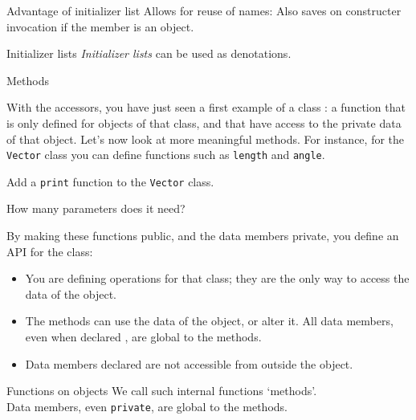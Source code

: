 \begin{block}{Advantage of initializer list}
  \label{sl:class-init-why}
  Allows for reuse of names:
  Also saves on constructer invocation if the member is an object.
\end{block}

\begin{block}{Initializer lists}
  \label{sl:class-inlist}
  \emph{Initializer lists} can be used as denotations.
\end{block}

 {Methods}

With the accessors, you have just seen a first example of a class
: a function that is only defined for objects of
that class, and that have access to the private data of that object.
Let's now look at more meaningful methods. For instance, for the
\lstinline{Vector} class you can define functions such as \lstinline{length} and
\lstinline{angle}. 
%

\begin{exercise}
  \label{ex:vectorclass-print}
  Add a \lstinline{print} function to the \lstinline{Vector} class.

  How many parameters does it need?
\end{exercise}

By making these functions public, and the data members
private, you define an \acf{API} for the class:
\begin{itemize}
\item You are defining operations for that class; they are the only
  way to access the data of the object.
\item The methods can use the data of the object, or alter it. All
  data members, even when declared , are global to the methods.
\item  Data members declared  are not accessible from outside the
  object.
\end{itemize}

\begin{slide}{Functions on objects}
  \label{sl:obj-func}
  We call such internal functions `methods'.\\
  Data members, even \lstinline{private}, are global to the methods.
\end{slide}

